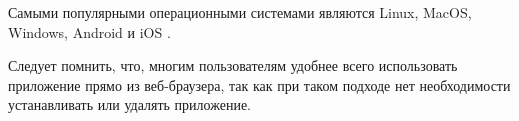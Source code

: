 Самыми популярными операционными системами являются Linux, MacOS, Windows,  Android и iOS \cite{TopOperatingSystems}.

Следует помнить, что, многим пользователям удобнее всего использовать приложение прямо из веб-браузера, так как при таком подходе нет необходимости устанавливать или удалять приложение.
